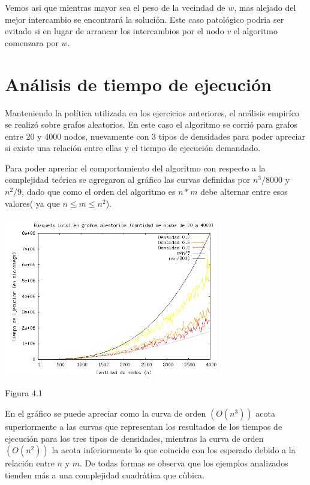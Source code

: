 \documentclass[a4paper,11pt] {article}
\begin{document}
Vemos asi que mientras mayor sea el peso de la vecindad de $w$, mas alejado del mejor intercambio se encontrar\'a la soluci\'on. Este caso patol\'ogico podria ser evitado si en lugar de arrancar los intercambios por el nodo $v$ el algoritmo comenzara por $w$.

\section*{An\'alisis de tiempo de ejecución}

Manteniendo la política utilizada en los ejercicios anteriores, el análisis empiríco se realizó sobre grafos aleatorios. En este caso el algoritmo se corrió para grafos entre 20 y 4000 nodos, nuevamente con 3 tipos de densidades
para poder apreciar si existe una relación entre ellas y el tiempo de ejecución demandado.

Para poder apreciar el comportamiento del algoritmo con respecto a la complejidad teórica se agregaron al gráfico las curvas definidas por $n^3/8000$ y $n^2/9$, dado que como el orden del algoritmo es $n * m$ debe alternar entre esos valores( ya que $n \leq m \leq n^2$).

\begin{center}
 \includegraphics[width=0.7\textwidth]{graficos/tiemposBL.png}
\begin{center}
Figura 4.1
\end{center}
\end{center}

En el gráfico se puede apreciar como la curva de orden $(O(n^3))$ acota superiormente a las curvas que representan los resultados de los tiempos de ejecución para los tres tipos de densidades, mientras la curva de orden $(O(n^2))$ la acota inferiormente lo que coincide con los esperado debido a la relación entre $n$ y $m$. De todas formas se observa que los ejemplos analizados tienden más a una complejidad cuadràtica que cùbica.
\end{document}
